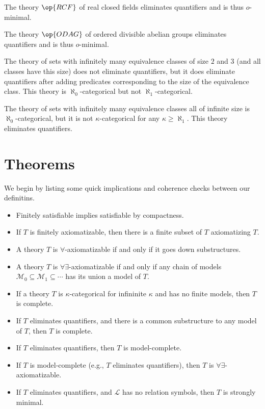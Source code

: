 \documentclass{article}
\begin{document}
\begin{example}
	The theory $\op{RCF}$ of real closed fields eliminates quantifiers and is thus $o$-minimal.
\end{example}
\begin{example}
	The theory $\op{ODAG}$ of ordered divisible abelian groups eliminates quantifiers and is thus $o$-minimal.
\end{example}
\begin{example}
	The theory of sets with infinitely many equivalence classes of size $2$ and $3$ (and all classes have this size) does not eliminate quantifiers, but it does eliminate quantifiers after adding predicates corresponding to the size of the equivalence class. This theory is $\aleph_0$-categorical but not $\aleph_1$-categorical.
\end{example}
\begin{example}
	The theory of sets with infinitely many equivalence classes all of infinite size is $\aleph_0$-catego\-rical, but it is not $\kappa$-categorical for any $\kappa\ge\aleph_1$. This theory eliminates quantifiers.
\end{example}

\newpage
\section{Theorems}

We begin by listing some quick implications and coherence checks between our definitins.
\begin{itemize}
	\item Finitely satisfiable implies satisfiable by compactness.
	\item If $T$ is finitely axiomatizable, then there is a finite subset of $T$ axiomatizing $T$.
	\item A theory $T$ is $\forall$-axiomatizable if and only if it goes down substructures.
	\item A theory $T$ is $\forall\exists$-axiomatizable if and only if any chain of models $\mathcal M_0\subseteq\mathcal M_1\subseteq\cdots$ has its union a model of $T$.
	\item If a theory $T$ is $\kappa$-categorical for infininite $\kappa$ and has no finite models, then $T$ is complete.
	\item If $T$ eliminates quantifiers, and there is a common substructure to any model of $T$, then $T$ is complete.
	\item If $T$ eliminates quantifiers, then $T$ is model-complete.
	\item If $T$ is model-complete (e.g., $T$ eliminates quantifiers), then $T$ is $\forall\exists$-axiomatizable.
	\item If $T$ eliminates quantifiers, and $\mathcal L$ has no relation symbols, then $T$ is strongly minimal.
\end{itemize}
\end{document}
